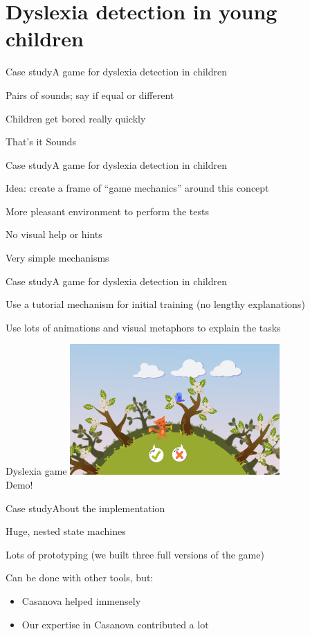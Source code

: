 \documentclass{beamer}
\begin{document}
\section{Dyslexia detection in young children}
\begin{slide}{Case study}{A game for dyslexia detection in children}{
\item Pairs of sounds; say if equal or different
\item Children get bored really quickly
}\end{slide}


\begin{frame}{That's it}
\center
\fontsize{18pt}{7.2}\selectfont
Sounds
\end{frame}


\begin{slide}{Case study}{A game for dyslexia detection in children}{
\item Idea: create a frame of ``game mechanics'' around this concept
\item More pleasant environment to perform the tests
\item No visual help or hints
\item Very simple mechanisms
}\end{slide}


\begin{slide}{Case study}{A game for dyslexia detection in children}{
\item Use a tutorial mechanism for initial training (no lengthy explanations)
\item Use lots of animations and visual metaphors to explain the tasks
}\end{slide}


\begin{frame}{Dyslexia game}
\center
\includegraphics[height=5cm]{Pics/dyslexia_game.png}
\\ Demo!
\end{frame}


\begin{slide}{Case study}{About the implementation}{
\item Huge, nested state machines
\item Lots of prototyping (we built three full versions of the game)
\item Can be done with other tools, but:
\begin{itemize}
\item Casanova helped immensely
\item Our expertise in Casanova contributed a lot
\end{itemize}
}\end{slide}
\end{document}
